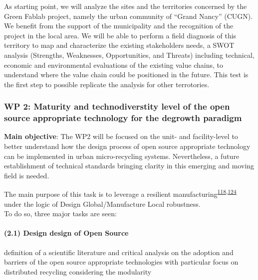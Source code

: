 \documentclass[
  12pt,
  a4paperpaper,
  onecolumn]{article}
\let\oldparagraph\paragraph
\renewcommand{\paragraph}[1]{\oldparagraph{#1}\mbox{}}
\let\paragraph\oldparagraph
\begin{document}
As starting point, we will analyze the sites and the territories
concerned by the Green Fablab project, namely the urban community of
``Grand Nancy'' (CUGN). We benefit from the support of the municipality
and the recognition of the project in the local area. We will be able to
perform a field diagnosis of this territory to map and characterize the
existing stakeholders needs, a SWOT analysis (Strengths, Weaknesses,
Opportunities, and Threats) including technical, economic and
environmental evaluations of the existing value chains, to understand
where the value chain could be positioned in the future. This test is
the first step to possible replicate the analysis for other terrotories.

\small

\normalsize

\hypertarget{wp-2-maturity-and-technodiverstity-level-of-the-open-source-appropriate-technology-for-the-degrowth-paradigm}{%
\subsubsection{WP 2: Maturity and technodiverstity level of the open
source appropriate technology for the degrowth
paradigm}\label{wp-2-maturity-and-technodiverstity-level-of-the-open-source-appropriate-technology-for-the-degrowth-paradigm}}

\textbf{Main objective}: The WP2 will be focused on the unit- and
facility-level to better understand how the design process of open
source appropriate technology can be implemented in urban
micro-recycling systems. Nevertheless, a future establishment of
technical standards bringing clarity in this emerging and moving field
is needed.

The main purpose of this task is to leverage a resilient
manufacturing\textsuperscript{\protect\hyperlink{ref-xu2021e}{118},\protect\hyperlink{ref-zhang2011}{124}}
under the logic of Design Global/Manufacture Local robustness.\\
To do so, three major tasks are seen:

\hypertarget{design-design-of-open-source}{%
\paragraph{(2.1) Design design of Open
Source}\label{design-design-of-open-source}}

definition of a scientific literature and critical analysis on the
adoption and barriers of the open source appropriate technologies with
particular focus on distributed recycling considering the modularity
\end{document}

